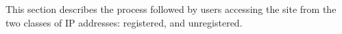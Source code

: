 \label{sec:functioning}
This section describes the process followed by users accessing
the site from the two classes of IP addresses: registered, and
unregistered.
